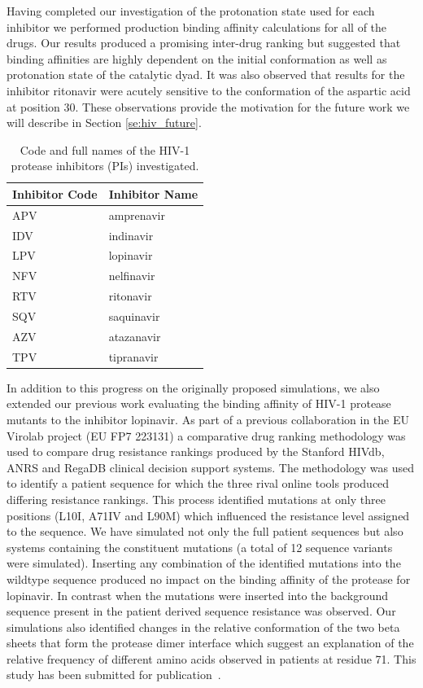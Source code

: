 \documentclass[a4paper,10pt]{article}
\begin{document}
Having completed our investigation 
of the protonation state used for each inhibitor we performed production binding affinity calculations 
for all of the drugs. Our results produced a promising inter-drug ranking but 
suggested that binding affinities are highly dependent on the initial conformation as well as protonation 
state of the catalytic dyad. It was also observed that results for the inhibitor ritonavir were acutely 
sensitive to the conformation of the aspartic acid at position 30. These observations provide the 
motivation for the future work we will describe in Section \ref{se:hiv_future}.

\begin{table}
\begin{center}
\begin{tabular}{l l}
\textbf{Inhibitor Code} & \textbf{Inhibitor Name}\\
\hline
APV & amprenavir\\
IDV & indinavir\\
LPV & lopinavir\\
NFV & nelfinavir\\
RTV & ritonavir\\
SQV & saquinavir\\
AZV & atazanavir \\
TPV & tipranavir \\
\hline
\end{tabular}
\end{center}
\caption{Code and full names of the HIV-1 protease inhibitors (PIs) investigated.}
\label{tab:inhibitors}
\end{table}

In addition to this progress on the originally proposed simulations, we also extended our previous work 
evaluating the binding affinity of HIV-1 protease mutants to the inhibitor lopinavir. As part of 
a previous collaboration in the EU Virolab project (EU FP7 223131) a comparative drug ranking 
methodology was used to compare drug resistance rankings produced by the Stanford HIVdb, ANRS 
and RegaDB clinical decision support systems. The methodology was used to identify a patient 
sequence for which the three rival online tools produced differing resistance rankings. This process 
identified mutations at only three positions (L10I, A71IV and L90M) which influenced the resistance 
level assigned to the sequence. We have simulated not only the full patient sequences but also 
systems containing the constituent mutations (a total of 12 sequence variants were simulated). 
Inserting any combination of the identified mutations into the wildtype sequence produced no impact 
on the binding affinity of the protease for lopinavir. In contrast when the mutations were inserted 
into the background sequence present in the patient derived sequence resistance was observed. Our 
simulations also identified changes in the relative conformation of the two beta sheets that form 
the protease dimer interface which suggest an explanation of the relative frequency of different 
amino acids observed in patients at residue 71. This study has been submitted for publication~\cite{Owain2011}.
\end{document}
